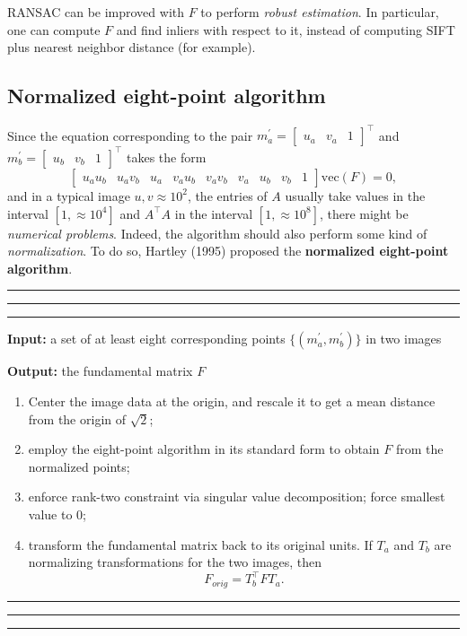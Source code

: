 \documentclass[10pt]{report}
\begin{document}
RANSAC can be improved with \(F\) to perform \emph{robust estimation}. In particular, one can compute \(F\) and find inliers with respect to it, instead of computing SIFT plus nearest neighbor distance (for example).

\subsection{Normalized eight\--point algorithm}
\label{sec:orgbdc6e5b}

Since the equation corresponding to the pair \(m^\prime_a = \begin{bmatrix}u_a & v_a & 1\end{bmatrix}^\top\) and \(m^\prime_b = \begin{bmatrix}u_b & v_b & 1\end{bmatrix}^\top\) takes the form $$\begin{bmatrix}u_a u_b & u_a v_b & u_a & v_a u_b & v_a v_b & v_a & u_b & v_b & 1 \end{bmatrix}\mbox{vec}(F) = 0,$$ and in a typical image \(u, v\approx 10^2\), the entries of \(A\) usually take values in the interval \([1, \approx 10^4]\) and \(A^\top A\) in the interval \([1, \approx 10^8]\), there might be \emph{numerical problems}. Indeed, the algorithm should also perform some kind of \emph{normalization}. To do so, Hartley (1995) proposed the \textbf{normalized eight\--point algorithm}.

\vspace*{0.6cm}\hrule
\hrule
\hrule
\vspace*{0.4cm}

\textbf{Input:} a set of at least eight corresponding points \(\{(m^\prime_a, m^\prime_b)\}\) in two images

\textbf{Output:} the fundamental matrix \(F\)

\begin{enumerate}
\item Center the image data at the origin, and rescale it to get a mean distance from the origin of \(\sqrt 2\);
\item employ the eight\--point algorithm in its standard form to obtain \(F\) from the normalized points;
\item enforce rank\--two constraint via singular value decomposition; force smallest value to \(0\);
\item transform the fundamental matrix back to its original units. If \(T_a\) and \(T_b\) are normalizing transformations for the two images, then $$F_{orig} = T^\top_b F T_a.$$
\end{enumerate}

\vspace*{0.6cm}\hrule
\hrule
\hrule
\vspace*{0.4cm}
\end{document}
